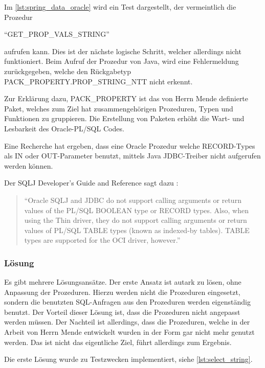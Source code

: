 Im \autoref{lst:spring_data_oracle} wird ein Test dargestellt, der vermeintlich die Prozedur 

\enquote{GET\_PROP\_VALS\_STRING} 

aufrufen kann. Dies ist der nächste logische Schritt, welcher allerdings nicht funktioniert. Beim Aufruf der Prozedur von Java, wird eine Fehlermeldung zurückgegeben, welche den Rückgabetyp PACK\_PROPERTY.PROP\_STRING\_NTT nicht erkennt. 

Zur Erklärung dazu, PACK\_PROPERTY ist das von Herrn Mende definierte Paket, welches zum Ziel hat zusammengehörigen Prozeduren, Typen und Funktionen zu gruppieren. Die Erstellung von Paketen erhöht die Wart- und Lesbarkeit des Oracle-PL/SQL Codes. 

Eine Recherche hat ergeben, dass eine Oracle Prozedur welche RECORD-Types als IN oder OUT-Parameter benutzt, mittels Java JDBC-Treiber nicht aufgerufen werden können. 

Der SQLJ Developer's Guide and Reference sagt dazu \citep[Kap. 5][]{oracle-dev-guide}:

\begin{quotation}
\enquote{Oracle SQLJ and JDBC do not support calling arguments or return values of the PL/SQL BOOLEAN type or RECORD types. Also, when using the Thin driver, they do not support calling arguments or return values of PL/SQL TABLE types (known as indexed-by tables). TABLE types are supported for the OCI driver, however.}
\end{quotation}

\subsubsection{Lösung}

Es gibt mehrere Lösungsansätze. Der erste Ansatz ist autark zu lösen, ohne Anpassung der Prozeduren. Hierzu werden nicht die Prozeduren eingesetzt, sondern die benutzten SQL-Anfragen aus den Prozeduren werden eigenständig benutzt. 
Der Vorteil dieser Lösung ist, dass die Prozeduren nicht angepasst werden müssen. Der Nachteil ist allerdings, dass die Prozeduren, welche in der Arbeit von Herrn Mende entwickelt wurden in der Form gar nicht mehr genutzt werden. Das ist nicht das eigentliche Ziel, führt allerdings zum Ergebnis. 

Die erste Lösung wurde zu Testzwecken implementiert, siehe \autoref{lst:select_string}.

